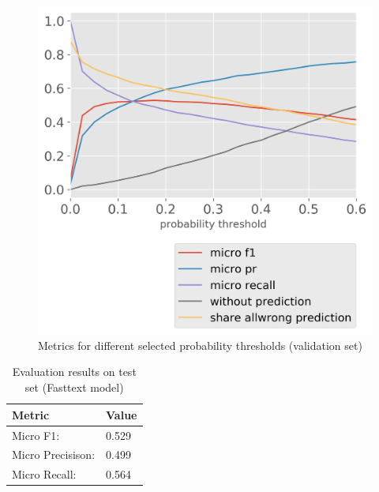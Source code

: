 \begin{figure}[t]
\centering
\includegraphics[width=.49\textwidth]{figures/research-fields/fields-precision-recall.png}
    \caption{Metrics for different selected probability thresholds (validation set)}
\label{fig:fields_precision_recall}
\end{figure}


\begin{table}[b]
\center
\small
    \caption{Evaluation results on test set (Fasttext model)}
  \label{tab:eval_research_field}
  \begin{tabular}{ll}
  \toprule
      Metric & Value \\
  \midrule
      Micro F1:          & 0.529 \\
      Micro Precisison:  & 0.499 \\
      Micro Recall: 	 & 0.564 \\
  \bottomrule
\end{tabular}
\end{table}






